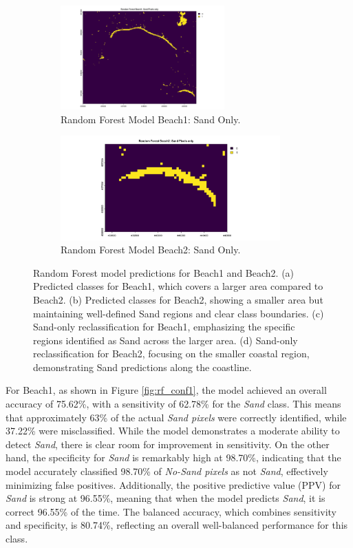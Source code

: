 \documentclass[a4paper,12pt]{article}
\begin{document}
\begin{figure} [H]
    \begin{subfigure}[b]{0.45\linewidth}
        \centering
        \includegraphics[width=\linewidth, height=4cm]{Random_Forest_Model/Random Forest Beach1 Sand Pixel Only.png}
        \caption{Random Forest Model Beach1: Sand Only.}
        \label{fig:rf_beach1_sand}
    \end{subfigure}
    \hfill
    \begin{subfigure}[b]{0.45\linewidth}
        \centering
        \includegraphics[width=\linewidth, height=4cm]{Random_Forest_Model/Random Forest Beach2: Sand Pixels only.png}
        \caption{Random Forest Model Beach2: Sand Only.}
        \label{fig:rf_beach2_sand}
    \end{subfigure}
    \caption[Random Forest model predictions for Beach1 and Beach2]{Random Forest model predictions for Beach1 and Beach2.
(a) Predicted classes for Beach1, which covers a larger area compared to Beach2.
(b) Predicted classes for Beach2, showing a smaller area but maintaining well-defined Sand regions and clear class boundaries.
(c) Sand-only reclassification for Beach1, emphasizing the specific regions identified as Sand across the larger area.
(d) Sand-only reclassification for Beach2, focusing on the smaller coastal region, demonstrating Sand predictions along the coastline.}
    \label{fig:rf_beach_predictions_combined}
\end{figure}

For Beach1, as shown in Figure \ref{fig:rf_conf1}, the model achieved an overall accuracy of 75.62\%, with a sensitivity of 62.78\% for the \textit{Sand} class. This means that approximately 63\% of the actual \textit{Sand pixels} were correctly identified, while 37.22\% were misclassified. While the model demonstrates a moderate ability to detect \textit{Sand}, there is clear room for improvement in sensitivity. On the other hand, the specificity for \textit{Sand} is remarkably high at 98.70\%, indicating that the model accurately classified 98.70\% of \textit{No-Sand pixels} as not \textit{Sand}, effectively minimizing false positives. Additionally, the positive predictive value (PPV) for \textit{Sand} is strong at 96.55\%, meaning that when the model predicts \textit{Sand}, it is correct 96.55\% of the time. The balanced accuracy, which combines sensitivity and specificity, is 80.74\%, reflecting an overall well-balanced performance for this class.
\end{document}
